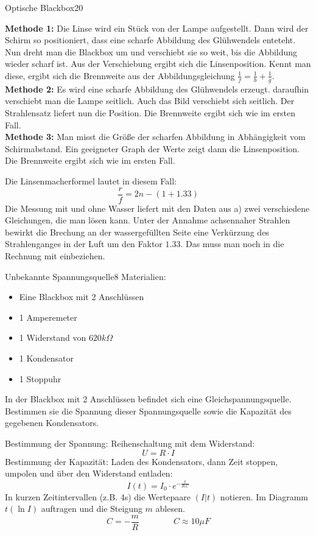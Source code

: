 \begin{problem}{Optische Blackbox}{20}
\begin{expsolution}
\begin{abcenum}
 \item \textbf{Methode 1:} Die Linse wird ein Stück von der Lampe aufgestellt. Dann wird der Schirm so positioniert, dass eine scharfe Abbildung des Glühwendels enteteht. Nun dreht man die Blackbox um und verschiebt sie so weit, bis die Abbildung wieder scharf ist. Aus der Verschiebung ergibt sich die Linsenposition. Kennt man diese, ergibt sich die Brennweite aus der Abbildungsgleichung $\frac 1 f = \frac 1 b + \frac 1 g$.\\
 \textbf{Methode 2:} Es wird eine scharfe Abbildung des Glühwendels erzeugt. daraufhin verschiebt man die Lampe seitlich. Auch das Bild verschiebt sich seitlich. Der Strahlensatz liefert nun die Position. Die Brennweite ergibt sich wie im ersten Fall.\\
 \textbf{Methode 3:} Man misst die Größe der scharfen Abbildung in Abhängigkeit vom Schirmabstand. Ein geeigneter Graph der Werte zeigt dann die Linsenposition. Die Brennweite ergibt sich wie im ersten Fall.
 \item Die Linsenmacherformel lautet in diesem Fall:
\[
 \frac r f = 2n-(1+1.33)
\]
Die Messung mit und ohne Wasser liefert mit den Daten aus a) zwei verschiedene Gleichungen, die man lösen kann. Unter der Annahme achsennaher Strahlen bewirkt die Brechung an der wassergefüllten Seite eine Verkürzung des Strahlenganges in der Luft um den Faktor $1.33$. Das muss man noch in die Rechnung mit einbeziehen.
\end{abcenum}
\end{expsolution}
\end{problem}



\begin{problem}{Unbekannte Spannungsquelle}{8}
Materialien:
\begin{itemize}
\item Eine Blackbox mit 2 Anschlüssen
\item 1 Amperemeter
\item 1 Widerstand von $620 \unit{k\Omega}$
\item 1 Kondensator
\item 1 Stoppuhr
\end{itemize}
In der Blackbox  mit 2 Anschlüssen befindet sich eine Gleichspannungsquelle. Bestimmen sie die Spannung dieser Spannungsquelle sowie die Kapazität des gegebenen Kondensators.
\begin{expsolution}
Bestimmung der Spannung: Reihenschaltung mit dem Widerstand:
\[
U = R\cdot I
\]
Bestimmung der Kapazität: Laden des Kondensators, dann Zeit stoppen, umpolen und über den Widerstand entladen:
\[
I(t) = I_0\cdot e^{-\frac{t}{R\,C}}
\]
In kurzen Zeitintervallen (z.B. 4s) die Wertepaare $(I|t)$ notieren. Im Diagramm $t(\ln I)$ auftragen und die Steigung $m$ ablesen.
\[
C = -\frac m R \qquad\qquad C \approx 10\unit{\mu F}
\]
\end{expsolution}
\end{problem}



